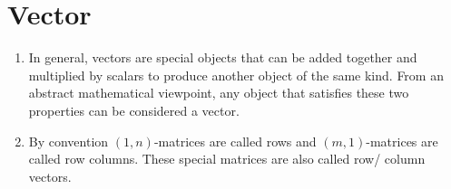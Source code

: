 \chapter{Vector}

\begin{enumerate}
    \item In general, vectors are special objects that can be added together and multiplied by scalars to produce another object of the same kind. From an abstract mathematical viewpoint, any object that satisfies these two properties can be considered a vector. 
    \hfill \cite{mfml/book/mml/Deisenroth-Faisal-Ong}

    \item By convention $(1, n)$-matrices are called rows and $(m, 1)$-matrices are called row columns. These special matrices are also called row/ column vectors.
    \hfill \cite{mfml/book/mml/Deisenroth-Faisal-Ong}

    
\end{enumerate}










